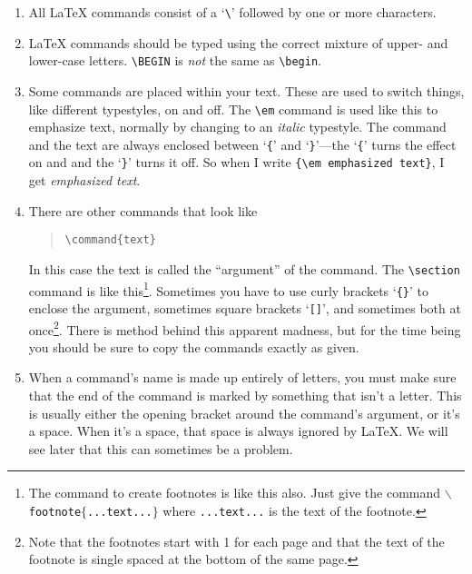\begin{enumerate}
 
\item All \LaTeX{} commands consist of a `\verb+\+' followed by one
or more characters.
 
\item \LaTeX{} commands should be typed using the correct mixture of
upper- and lower-case letters.
\verb+\BEGIN+ is {\em not\/} the same as \verb+\begin+.
 
\item Some commands are placed within your text.  These are used to
switch things, like different typestyles, on and off.
The \verb+\em+ command is used like this to emphasize text, normally
by changing to an {\it italic\/} typestyle.
The command and the text are always enclosed between
`\verb+{+' and `\verb+}+'---the `\verb+{+' turns the effect on and
and the `\verb+}+' turns it off.
So when I write \verb+{\em emphasized text}+,
I get {\em emphasized text}.
 
\item There are other commands that look like
\begin{quote}\begin{verbatim}
\command{text}
\end{verbatim}\end{quote}
In this case the text is called the ``argument'' of the command.  The
\verb+\section+ command is like
this\footnote{The command to create footnotes is like this also.
Just give the command {\tt $\backslash$footnote$\{$...text...$\}$} where
{\tt ...text...} is the text of the footnote.}.
Sometimes you have to use curly brackets `\verb+{}+' to enclose the
argument, sometimes square brackets `\verb+[]+', and sometimes
both at
once\footnote{Note that the footnotes start with 1 for each page
and that the text of the footnote is single spaced at the bottom
of the same page.}.
There is method behind this apparent madness, but for the
time being you should be sure to copy the commands exactly as given.
 
\item When a command's name is made up entirely of letters, you must
make sure that the end of the command is marked by something that
isn't a letter.
This is usually either the opening bracket around the command's
argument, or it's a space.
When it's a space, that space is always ignored by \LaTeX. We
will see later that this can sometimes be a problem.
 
\end{enumerate}
 
